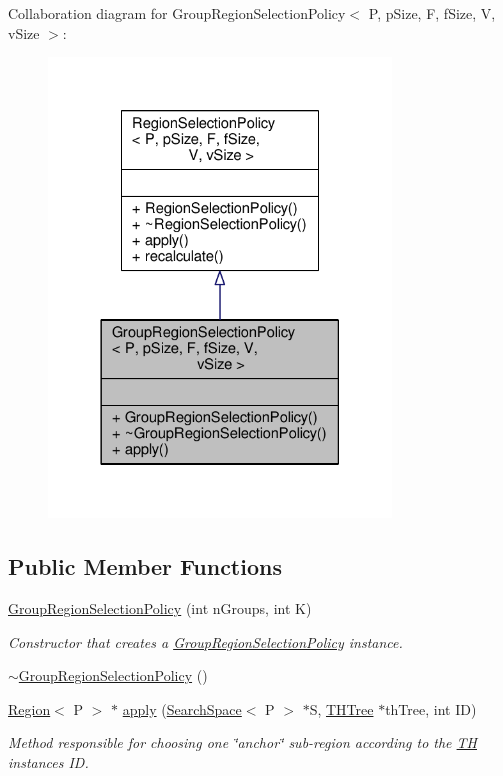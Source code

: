 Collaboration diagram for Group\+Region\+Selection\+Policy$<$ P, p\+Size, F, f\+Size, V, v\+Size $>$\+:\nopagebreak
\begin{figure}[H]
\begin{center}
\leavevmode
\includegraphics[width=258pt]{classGroupRegionSelectionPolicy__coll__graph}
\end{center}
\end{figure}
\subsection*{Public Member Functions}
\begin{DoxyCompactItemize}
\item 
\hyperlink{classGroupRegionSelectionPolicy_aa4b4b59ce5231206f49b320e2aeb1cd6}{Group\+Region\+Selection\+Policy} (int n\+Groups, int K)
\begin{DoxyCompactList}\small\item\em Constructor that creates a \hyperlink{classGroupRegionSelectionPolicy}{Group\+Region\+Selection\+Policy} instance. \end{DoxyCompactList}\item 
\hyperlink{classGroupRegionSelectionPolicy_a0170690c1c49df4107b800e25e88918e}{$\sim$\+Group\+Region\+Selection\+Policy} ()
\item 
\hyperlink{classRegion}{Region}$<$ P $>$ $\ast$ \hyperlink{classGroupRegionSelectionPolicy_a28a39331dafaa273d30bef8f0da9e4fb}{apply} (\hyperlink{classSearchSpace}{Search\+Space}$<$ P $>$ $\ast$S, \hyperlink{classTHTree}{T\+H\+Tree} $\ast$th\+Tree, int ID)
\begin{DoxyCompactList}\small\item\em Method responsible for choosing one \char`\"{}anchor\char`\"{} sub-\/region according to the \hyperlink{classTH}{TH} instance\textquotesingle{}s ID. \end{DoxyCompactList}\end{DoxyCompactItemize}


